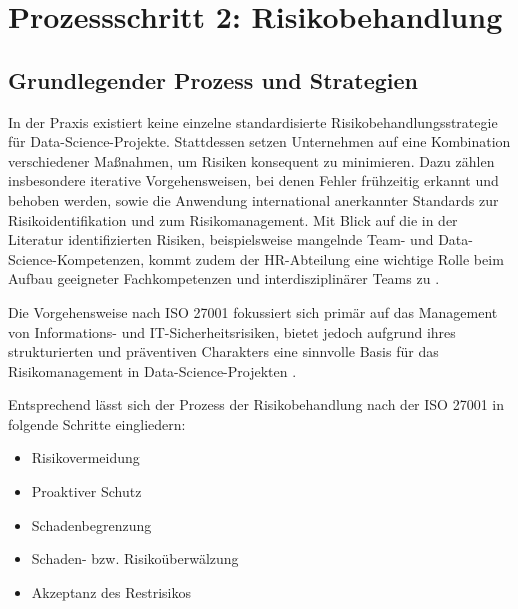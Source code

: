 \section{Prozessschritt 2: Risikobehandlung} \label{sec:methode2}
\subsection{Grundlegender Prozess und Strategien}
In der Praxis existiert keine einzelne standardisierte Risikobehandlungsstrategie für Data-Science-Projekte. 
Stattdessen setzen Unternehmen auf eine Kombination verschiedener Maßnahmen, um Risiken konsequent zu minimieren. 
Dazu zählen insbesondere iterative Vorgehensweisen, bei denen Fehler frühzeitig erkannt und behoben werden, 
sowie die Anwendung international anerkannter Standards zur Risikoidentifikation und zum Risikomanagement. 
Mit Blick auf die in der Literatur identifizierten Risiken, beispielsweise mangelnde Team- und Data-Science-Kompetenzen, 
kommt zudem der HR-Abteilung eine wichtige Rolle beim Aufbau geeigneter Fachkompetenzen und interdisziplinärer Teams zu \cite{holtkemper_risk_2023}.

Die Vorgehensweise nach ISO 27001 fokussiert sich primär auf das Management von Informations- und IT-Sicherheitsrisiken, 
bietet jedoch aufgrund ihres strukturierten und präventiven Charakters eine sinnvolle Basis für das Risikomanagement 
in Data-Science-Projekten \cite{Kersten_27001_2019}. 

Entsprechend lässt sich der Prozess der Risikobehandlung nach der ISO 27001
in folgende Schritte eingliedern:

\begin{itemize}
    \item Risikovermeidung
    \item Proaktiver Schutz
    \item Schadenbegrenzung
    \item Schaden- bzw. Risikoüberwälzung
    \item Akzeptanz des Restrisikos
\end{itemize}

